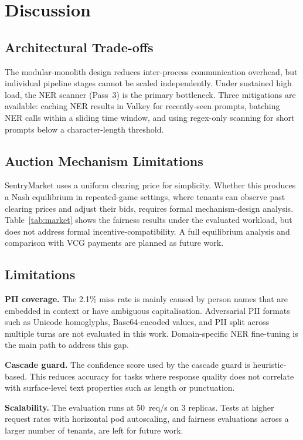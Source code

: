 \documentclass[conference]{IEEEtran}
\begin{document}
\section{Discussion}

\subsection{Architectural Trade-offs}
The modular-monolith design reduces inter-process communication overhead, but individual pipeline stages cannot be scaled independently. Under sustained high load, the NER scanner (Pass~3) is the primary bottleneck. Three mitigations are available: caching NER results in Valkey for recently-seen prompts, batching NER calls within a sliding time window, and using regex-only scanning for short prompts below a character-length threshold.

\subsection{Auction Mechanism Limitations}
SentryMarket uses a uniform clearing price for simplicity. Whether this produces a Nash equilibrium in repeated-game settings, where tenants can observe past clearing prices and adjust their bids, requires formal mechanism-design analysis. Table~\ref{tab:market} shows the fairness results under the evaluated workload, but does not address formal incentive-compatibility. A full equilibrium analysis and comparison with VCG payments \cite{b_vcg} are planned as future work.

\subsection{Limitations}
\textbf{PII coverage.} The 2.1\% miss rate is mainly caused by person names that are embedded in context or have ambiguous capitalisation. Adversarial PII formats such as Unicode homoglyphs, Base64-encoded values, and PII split across multiple turns are not evaluated in this work. Domain-specific NER fine-tuning is the main path to address this gap.

\textbf{Cascade guard.} The confidence score used by the cascade guard is heuristic-based. This reduces accuracy for tasks where response quality does not correlate with surface-level text properties such as length or punctuation.

\textbf{Scalability.} The evaluation runs at 50~req/s on 3 replicas. Tests at higher request rates with horizontal pod autoscaling, and fairness evaluations across a larger number of tenants, are left for future work.
\end{document}
